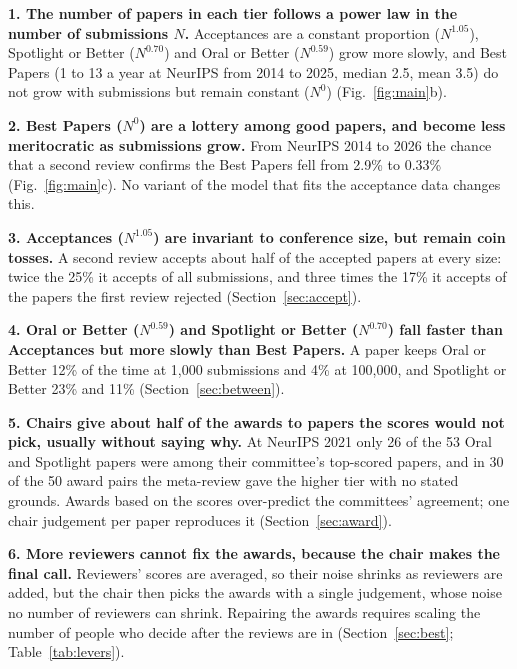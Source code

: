 \documentclass{article}
\begin{document}
\textbf{1. The number of papers in each tier follows a power law in the number of submissions $N$.} Acceptances are a constant proportion ($N^{1.05}$), Spotlight or Better ($N^{0.70}$) and Oral or Better ($N^{0.59}$) grow more slowly, and Best Papers (1 to 13 a year at NeurIPS from 2014 to 2025, median 2.5, mean 3.5) do not grow with submissions but remain constant ($N^0$) (Fig.~\ref{fig:main}b).

\textbf{2. Best Papers ($N^0$) are a lottery among good papers, and become less meritocratic as submissions grow.} From NeurIPS 2014 to 2026 the chance that a second review confirms the Best Papers fell from 2.9\% to 0.33\% (Fig.~\ref{fig:main}c). No variant of the model that fits the acceptance data changes this.

\textbf{3. Acceptances ($N^{1.05}$) are invariant to conference size, but remain coin tosses.} A second review accepts about half of the accepted papers at every size: twice the 25\% it accepts of all submissions, and three times the 17\% it accepts of the papers the first review rejected (Section~\ref{sec:accept}).

\textbf{4. Oral or Better ($N^{0.59}$) and Spotlight or Better ($N^{0.70}$) fall faster than Acceptances but more slowly than Best Papers.} A paper keeps Oral or Better 12\% of the time at 1,000 submissions and 4\% at 100,000, and Spotlight or Better 23\% and 11\% (Section~\ref{sec:between}).

\textbf{5. Chairs give about half of the awards to papers the scores would not pick, usually without saying why.} At NeurIPS 2021 only 26 of the 53 Oral and Spotlight papers were among their committee's top-scored papers, and in 30 of the 50 award pairs the meta-review gave the higher tier with no stated grounds. Awards based on the scores over-predict the committees' agreement; one chair judgement per paper reproduces it (Section~\ref{sec:award}).

\textbf{6. More reviewers cannot fix the awards, because the chair makes the final call.} Reviewers' scores are averaged, so their noise shrinks as reviewers are added, but the chair then picks the awards with a single judgement, whose noise no number of reviewers can shrink. Repairing the awards requires scaling the number of people who decide after the reviews are in (Section~\ref{sec:best}; Table~\ref{tab:levers}).
\end{document}
